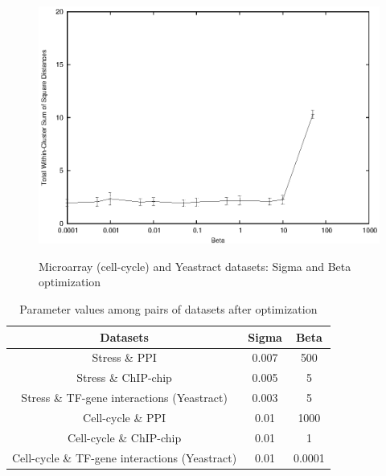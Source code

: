 \begin{figure}[htp]
\begin{center}
            {\label{fig:ccycle_tf_withinss}\includegraphics[scale=0.7]{chapter3/ccycle_tf_withinss.eps}}
  \end{center}
  \caption{Microarray (cell-cycle) and Yeastract datasets: Sigma and Beta optimization}
  \label{fig:ccycle_tf_opt}
\end{figure}

\begin{table}[t]
\centering
\begin{tabular}{|c|c|c|}
\hline
Datasets & Sigma & Beta \\
\hline
Stress \& PPI                              & 0.007 & 500 \\ 
Stress \& ChIP-chip                        & 0.005 &  5\\
Stress \& TF-gene interactions (Yeastract) & 0.003 &  5\\
\hline \hline
Cell-cycle \& PPI                              & 0.01 & 1000 \\ 
Cell-cycle \& ChIP-chip                        & 0.01 & 1 \\
Cell-cycle \& TF-gene interactions (Yeastract) & 0.01 & 0.0001 \\
\hline 
\end{tabular}
\caption{Parameter values among pairs of datasets after optimization}
\label{tab:maxent_mean_pvals}
\end{table}
\clearpage

